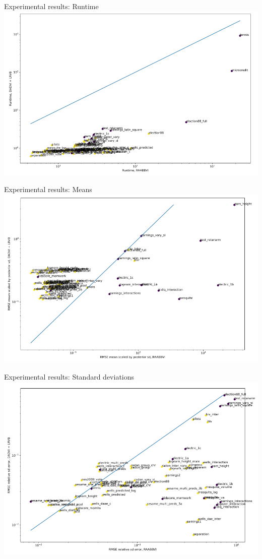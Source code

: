 \documentclass[8pt]{beamer}\usepackage[]{graphicx}\usepackage[]{color}
\begin{document}
\begin{frame}{Experimental results: Runtime}
    \includegraphics[width=0.9\linewidth]{runtime}
\end{frame}

\begin{frame}{Experimental results: Means}
    \includegraphics[width=0.9\linewidth]{means}
\end{frame}

\begin{frame}{Experimental results: Standard deviations}
    \includegraphics[width=0.9\linewidth]{sd}
\end{frame}
\end{document}
